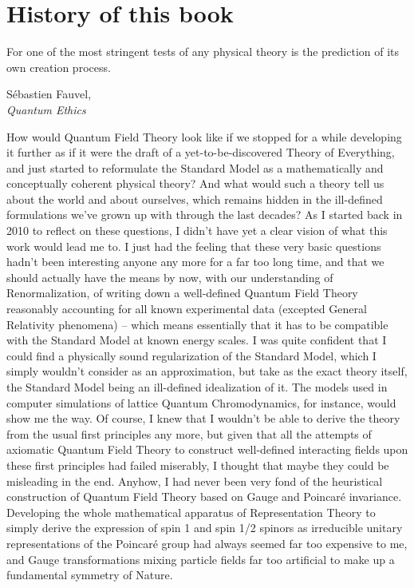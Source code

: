 \chapter*{History of this book}

\renewcommand{\epigraphwidth}{8.3cm}
\epigraph{For one of the most stringent tests of any physical theory is the prediction of its own creation process.}{Sébastien Fauvel,\\\textit{Quantum Ethics}~\cite{Fauvel2013}}

How would Quantum Field Theory look like if we stopped for a while developing it further as if it were the draft of a yet-to-be-discovered Theory of Everything, and just started to reformulate the Standard Model as a mathematically and conceptually coherent physical theory? And what would such a theory tell us about the world and about ourselves, which remains hidden in the ill-defined formulations we've grown up with through the last decades? As I started back in 2010 to reflect on these questions, I didn't have yet a clear vision of what this work would lead me to.
I just had the feeling that these very basic questions hadn't been interesting anyone any more for a far too long time, and that we should actually have the means by now, with our understanding of Renormalization, of writing down a well-defined Quantum Field Theory reasonably accounting for all known experimental data (excepted General Relativity phenomena) -- which means essentially that it has to be compatible with the Standard Model at known energy scales.
I was quite confident that I could find a physically sound regularization of the Standard Model, which I simply wouldn't consider as an approximation, but take as the exact theory itself, the Standard Model being an ill-defined idealization of it.
The models used in computer simulations of lattice Quantum Chromodynamics, for instance, would show me the way.
Of course, I knew that I wouldn't be able to derive the theory from the usual first principles any more, but given that all the attempts of axiomatic Quantum Field Theory to construct well-defined interacting fields upon these first principles had failed miserably, I thought that maybe they could be misleading in the end.
Anyhow, I had never been very fond of the heuristical construction of Quantum Field Theory based on Gauge and Poincaré invariance.
Developing the whole mathematical apparatus of Representation Theory to simply derive the expression of spin 1 and spin 1/2 spinors as irreducible unitary representations of the Poincaré group had always seemed far too expensive to me, and Gauge transformations mixing particle fields far too artificial to make up a fundamental symmetry of Nature.

